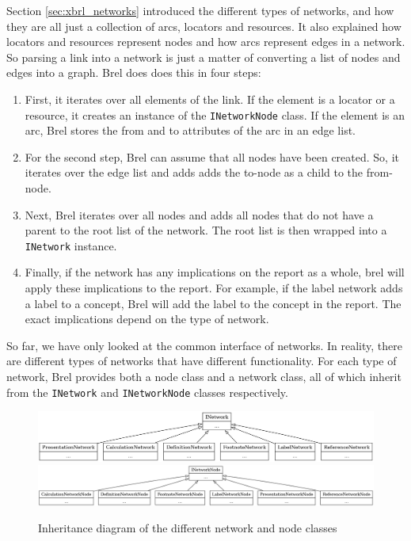 Section \ref{sec:xbrl_networks} introduced the different types of networks, and how they are all just a collection of arcs, locators and resources.
It also explained how locators and resources represent nodes and how arcs represent edges in a network.
So parsing a link into a network is just a matter of converting a list of nodes and edges into a graph.
Brel does does this in four steps:

\begin{enumerate}\label{enum:network_parsing}
    \item First, it iterates over all elements of the link. 
    If the element is a locator or a resource, it creates an instance of the \texttt{INetworkNode} class.
    If the element is an arc, Brel stores the from and to attributes of the arc in an edge list.
    \item For the second step, Brel can assume that all nodes have been created.
    So, it iterates over the edge list and adds adds the to-node as a child to the from-node.
    \item Next, Brel iterates over all nodes and adds all nodes that do not have a parent to the root list of the network.
    The root list is then wrapped into a \texttt{INetwork} instance.
    \item Finally, if the network has any implications on the report as a whole, brel will apply these implications to the report.
    For example, if the label network adds a label to a concept, Brel will add the label to the concept in the report.
    The exact implications depend on the type of network.
\end{enumerate}

So far, we have only looked at the common interface of networks.
In reality, there are different types of networks that have different functionality.
For each type of network, Brel provides both a node class and a network class, all of which inherit from the \texttt{INetwork} and \texttt{INetworkNode} classes respectively.

\begin{figure}[H]
    \caption{Inheritance diagram of the different network and node classes}
    \label{fig:network_inheritance_diagram}
    \includegraphics[width=\textwidth]{images/network_types.png}
    \includegraphics[width=\textwidth]{images/network_node_types.png}
\end{figure}

